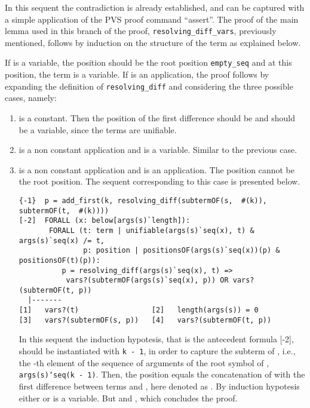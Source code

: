 \documentclass[submission,copyright,creativecommons]{eptcs}
\begin{document}
In this sequent the contradiction is already established, and can be
captured with a simple application of the PVS proof command
``assert''. The proof of the main lemma used in this branch of the
proof, {\tt resolving\_diff\_vars}, previously mentioned, follows by
induction on the structure of the term  as explained below.

If  is a variable, the position  should be the root position
{\tt empty\_seq} and at this position, the term  is a
variable.  If  is an application, the proof follows by expanding
the definition of {\tt resolving\_diff} and considering the three
possible cases, namely:

\begin{enumerate}

\item  is a constant. Then the position of the first difference
  should be  and  should be a variable, since the
  terms are unifiable.

\item  is a non constant application and  is a variable. Similar
  to the previous case.

\item  is a non constant application and  is an application.
  The position  cannot be the root position. The sequent
  corresponding to this case is presented below.

  {\small
\begin{verbatim}
{-1}  p = add_first(k, resolving_diff(subtermOF(s,  #(k)), subtermOF(t,  #(k))))
[-2]  FORALL (x: below[args(s)`length]):
       FORALL (t: term | unifiable(args(s)`seq(x), t) & args(s)`seq(x) /= t,
               p: position | positionsOF(args(s)`seq(x))(p) & positionsOF(t)(p)):
          p = resolving_diff(args(s)`seq(x), t) =>
           vars?(subtermOF(args(s)`seq(x), p)) OR vars?(subtermOF(t, p))
  |-------
[1]   vars?(t)                 [2]   length(args(s)) = 0
[3]   vars?(subtermOF(s, p))   [4]   vars?(subtermOF(t, p))
\end{verbatim}
  }

  In this sequent the induction hypotesis, that is the antecedent
  formula [-2], should be instantiated with {\tt k - 1}, in order to
  capture the subterm of , i.e., the -th element of the
  sequence of arguments of the root symbol of , {\tt args(s)`seq(k
    - 1)}. Then, the position  equals the concatenation of  with
  the first difference between terms  and , here denoted
  as . By induction hypotesis either  or
   is a variable. But  and
  , which concludes the proof.

\end{enumerate}
\end{document}
